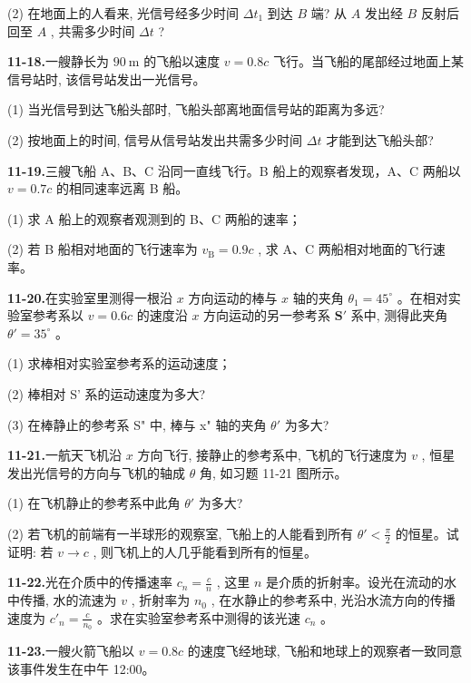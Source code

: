 (2) 在地面上的人看来, 光信号经多少时间 $\Delta t_{1}$ 到达 $B$ 端? 从 $A$ 发出经 $B$ 反射后回至 $A$ , 共需多少时间 $\Delta t$ ?

\vfill\newpage

\textbf{11-18.}一艘静长为 $90 \mathrm{~m}$ 的飞船以速度 $v = 0.8 c$ 飞行。当飞船的尾部经过地面上某信号站时, 该信号站发出一光信号。

(1) 当光信号到达飞船头部时, 飞船头部离地面信号站的距离为多远?

(2) 按地面上的时间, 信号从信号站发出共需多少时间 $\Delta t$ 才能到达飞船头部?

\vfill


\textbf{11-19.}三艘飞船 A、B、C 沿同一直线飞行。B 船上的观察者发现，A、C 两船以 $v = 0.7c$ 的相同速率远离 B 船。

(1) 求 A 船上的观察者观测到的 B、C 两船的速率；

(2) 若 B 船相对地面的飞行速率为 $v_{\mathrm{B}} = 0.9c$ , 求 A、C 两船相对地面的飞行速率。

\vfill\newpage

\textbf{11-20.}在实验室里测得一根沿 $x$ 方向运动的棒与 $x$ 轴的夹角 $\theta_{1} = 45^{\circ}$ 。在相对实验室参考系以 $v = 0.6c$ 的速度沿 $x$ 方向运动的另一参考系 $\mathbf{S}'$ 系中, 测得此夹角 $\theta' = 35^{\circ}$ 。

(1) 求棒相对实验室参考系的运动速度；

(2) 棒相对 S' 系的运动速度为多大?

(3) 在棒静止的参考系 S" 中, 棒与 x" 轴的夹角 $\theta'$ 为多大?

\vfill


\textbf{11-21.}一航天飞机沿 $x$ 方向飞行, 接静止的参考系中, 飞机的飞行速度为 $v$ , 恒星发出光信号的方向与飞机的轴成 $\theta$ 角, 如习题 11-21 图所示。

(1) 在飞机静止的参考系中此角 $\theta'$ 为多大?

(2) 若飞机的前端有一半球形的观察室, 飞船上的人能看到所有 $\theta' < \frac{\pi}{2}$ 的恒星。试证明: 若 $v \to c$ , 则飞机上的人几乎能看到所有的恒星。



\vfill\newpage

\textbf{11-22.}光在介质中的传播速率 $c_{n} = \frac{c}{n}$ , 这里 $n$ 是介质的折射率。设光在流动的水中传播, 水的流速为 $v$ , 折射率为 $n_{0}$ , 在水静止的参考系中, 光沿水流方向的传播速度为 $c'_{n} = \frac{c}{n_{0}}$ 。求在实验室参考系中测得的该光速 $c_{n}$ 。

\vfill


\textbf{11-23.}一艘火箭飞船以 $v = 0.8c$ 的速度飞经地球, 飞船和地球上的观察者一致同意该事件发生在中午 12:00。

